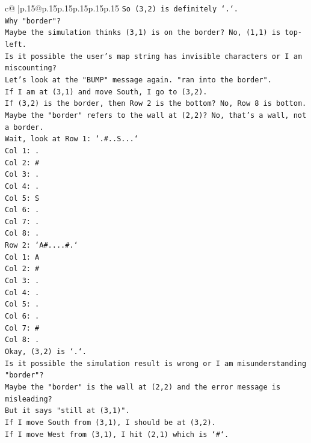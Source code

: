 \documentclass{article}
\begin{document}
{\begin{supertabular}{c@{$\;$}|p{.15\linewidth}@{}p{.15\linewidth}p{.15\linewidth}p{.15\linewidth}p{.15\linewidth}p{.15\linewidth}}
{{{\texttt{So (3,2) is definitely `.`.} \\
\texttt{Why "border"?} \\
\texttt{Maybe the simulation thinks (3,1) is on the border? No, (1,1) is top{-}left.} \\
\texttt{Is it possible the user's map string has invisible characters or I am miscounting?} \\
\texttt{Let's look at the "BUMP" message again. "ran into the border".} \\
\texttt{If I am at (3,1) and move South, I go to (3,2).} \\
\texttt{If (3,2) is the border, then Row 2 is the bottom? No, Row 8 is bottom.} \\
\texttt{Maybe the "border" refers to the wall at (2,2)? No, that's a wall, not a border.} \\
\texttt{Wait, look at Row 1: `.\#..S...`} \\
\texttt{Col 1: .} \\
\texttt{Col 2: \#} \\
\texttt{Col 3: .} \\
\texttt{Col 4: .} \\
\texttt{Col 5: S} \\
\texttt{Col 6: .} \\
\texttt{Col 7: .} \\
\texttt{Col 8: .} \\
\texttt{Row 2: `A\#....\#.`} \\
\texttt{Col 1: A} \\
\texttt{Col 2: \#} \\
\texttt{Col 3: .} \\
\texttt{Col 4: .} \\
\texttt{Col 5: .} \\
\texttt{Col 6: .} \\
\texttt{Col 7: \#} \\
\texttt{Col 8: .} \\
\texttt{Okay, (3,2) is `.`.} \\
\texttt{Is it possible the simulation result is wrong or I am misunderstanding "border"?} \\
\texttt{Maybe the "border" is the wall at (2,2) and the error message is misleading?} \\
\texttt{But it says "still at (3,1)".} \\
\texttt{If I move South from (3,1), I should be at (3,2).} \\
\texttt{If I move West from (3,1), I hit (2,1) which is `\#`.} \\
}}}
\end{supertabular}}
\end{document}
